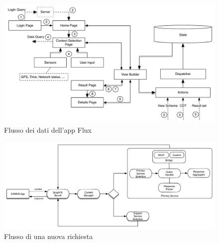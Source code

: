 


\begin{figure}[ht]
	\centering
	\includegraphics[width=\textwidth]{4-progettazione-alto-livello/Immagini/app_dataflow.pdf}
	\caption{Flusso dei dati dell'app Flux}\label{fig:app-dataflow}
\end{figure}

\begin{figure}[ht]
	\centering
	\includegraphics[width=\textwidth]{4-progettazione-alto-livello/Immagini/flusso-richiesta-backend.pdf}
	\caption{Flusso di una nuova richiesta\label{fig:flusso-nuova-richiesta}}
\end{figure}

